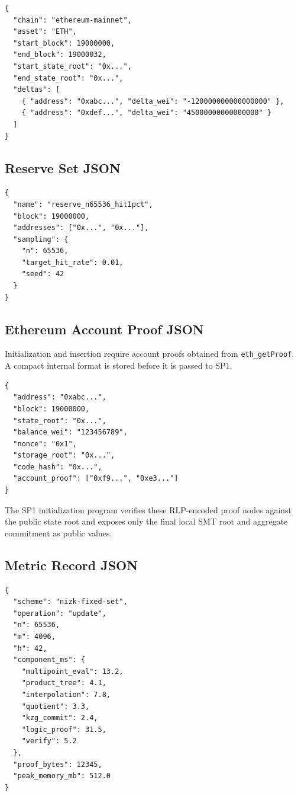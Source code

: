 \documentclass[UTF8,a4paper,11pt]{ctexart}
\begin{document}
\begin{lstlisting}
{
  "chain": "ethereum-mainnet",
  "asset": "ETH",
  "start_block": 19000000,
  "end_block": 19000032,
  "start_state_root": "0x...",
  "end_state_root": "0x...",
  "deltas": [
    { "address": "0xabc...", "delta_wei": "-120000000000000000" },
    { "address": "0xdef...", "delta_wei": "45000000000000000" }
  ]
}
\end{lstlisting}

\subsection{Reserve Set JSON}

\begin{lstlisting}
{
  "name": "reserve_n65536_hit1pct",
  "block": 19000000,
  "addresses": ["0x...", "0x..."],
  "sampling": {
    "n": 65536,
    "target_hit_rate": 0.01,
    "seed": 42
  }
}
\end{lstlisting}


\subsection{Ethereum Account Proof JSON}

Initialization and insertion require account proofs obtained from \texttt{eth\_getProof}. A compact internal format is stored before it is passed to SP1.

\begin{lstlisting}
{
  "address": "0xabc...",
  "block": 19000000,
  "state_root": "0x...",
  "balance_wei": "123456789",
  "nonce": "0x1",
  "storage_root": "0x...",
  "code_hash": "0x...",
  "account_proof": ["0xf9...", "0xe3..."]
}
\end{lstlisting}

The SP1 initialization program verifies these RLP-encoded proof nodes against the public state root and exposes only the final local SMT root and aggregate commitment as public values.

\subsection{Metric Record JSON}

\begin{lstlisting}
{
  "scheme": "nizk-fixed-set",
  "operation": "update",
  "n": 65536,
  "m": 4096,
  "h": 42,
  "component_ms": {
    "multipoint_eval": 13.2,
    "product_tree": 4.1,
    "interpolation": 7.8,
    "quotient": 3.3,
    "kzg_commit": 2.4,
    "logic_proof": 31.5,
    "verify": 5.2
  },
  "proof_bytes": 12345,
  "peak_memory_mb": 512.0
}
\end{lstlisting}
\end{document}
